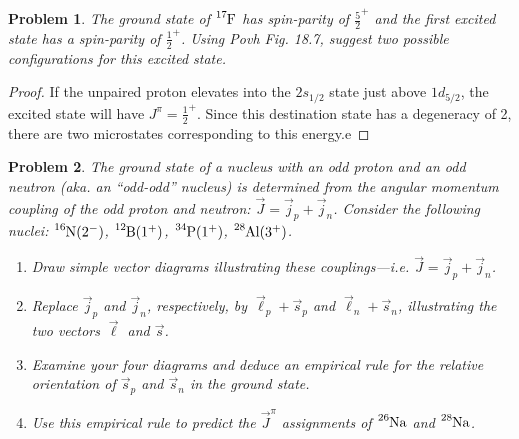 \documentclass{article}
\newtheorem{plm}{Problem}
\begin{document}
\begin{plm}
  The ground state of $\ce{^{17}F}$ has spin-parity of $\frac{5}{2}^{+}$ and the first excited state has a spin-parity of $\frac{1}{2}^{+}$.
  Using Povh Fig. 18.7, suggest two possible configurations for this excited state.
\end{plm}

\begin{proof}
  If the unpaired proton elevates into the $2s_{1/2}$ state just above $1d_{5/2}$, the excited state will have $J^{\pi} = \frac{1}{2}^{+}$.
  Since this destination state has a degeneracy of 2, there are two microstates corresponding to this energy.e
\end{proof}

\begin{plm}
  The ground state of a nucleus with an odd proton and an odd neutron (aka. an ``odd-odd'' nucleus)
  is determined from the angular momentum coupling of the odd proton and neutron: $\vec{J} = \vec{j}_{p} + \vec{j}_{n}$.
  Consider the following nuclei: $\ce{^{16}N}(2^{-})$, $\ce{^{12}B}(1^{+})$, $\ce{^{34}P}(1^{+})$, $\ce{^{28}Al}(3^{+})$.
  \begin{enumerate}
  \item Draw simple vector diagrams illustrating these couplings---i.e.  $\vec{J} = \vec{j}_{p} + \vec{j}_{n}$.
  \item Replace $\vec{j}_{p}$ and $\vec{j}_{n}$, respectively, by $\vec{\ell}_{p} + \vec{s}_{p}$ and $\vec{\ell}_{n} + \vec{s}_{n}$,
    illustrating the two vectors $\vec{\ell}$ and $\vec{s}$.
  \item Examine your four diagrams and deduce an empirical rule for the relative orientation
    of $\vec{s}_{p}$ and $\vec{s}_{n}$ in the ground state.
  \item Use this empirical rule to predict the $\vec{J}^{\pi}$ assignments of $\ce{^{26}Na}$ and $\ce{^{28}Na}$.
  \end{enumerate}
\end{plm}
\end{document}
